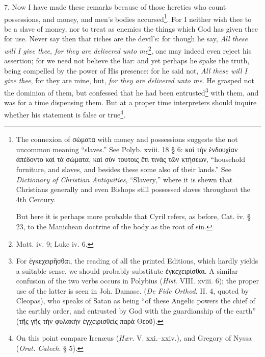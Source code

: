 7. Now I have made these remarks because of those heretics who count possessions, and money, and men’s bodies accursed\footnote{The connexion of \textgreek{σώματα} with money and possessions suggests the not uncommon meaning “slaves.” See Polyb. xviii. 18 § 6: \textgreek{καὶ τὴν ἐνδουχίαν ἀπέδοντο καὶ τὰ σώματα, καὶ σὺν τουτοις ἔτι τινὰς τῶν κτήσεων}, “household furniture, and slaves, and besides these some also of their lands.” See \emph{Dictionary of Christian Antiquities}, “Slavery,” where it is shewn that Christians generally and even Bishops still possessed slaves throughout the 4th Century. \par But here it is perhaps more probable that Cyril refers, as before, Cat. iv. § 23, to the Manichean doctrine of the body as the root of sin.}. For I neither wish thee to be a slave of money, nor to treat as enemies the things which God has given thee for use. Never say then that riches are the devil’s: for though he say, \emph{All these will I give thee, for they are delivered unto me}\footnote{Matt. iv. 9; Luke iv. 6.}, one may indeed even reject his assertion; for we need not believe the liar: and yet perhaps he spake the truth, being compelled by the power of His presence: for he said not, \emph{All these will I give thee}, for they are mine, but, \emph{for they are delivered unto me}. He grasped not the dominion of them, but confessed that he had been entrusted\footnote{For \textgreek{ἐγκεχειρῆσθαι}, the reading of all the printed Editions, which hardly yields a suitable sense, we should probably substitute \textgreek{ἐγκεχειρίσθαι}. A similar confusion of the two verbs occurs in Polybius (\emph{Hist}. VIII. xviii. 6); the proper use of the latter is seen in Joh. Damasc. (\emph{De Fide Orthod}. II. 4, quoted by Cleopas), who speaks of Satan as being “of these Angelic powers the chief of the earthly order, and entrusted by God with the guardianship of the earth” (\textgreek{τῆς γῆς τὴν φυλακὴν ἐγχειρισθεὶς παρὰ Θεοῦ}).} with them, and was for a time dispensing them. But at a proper time interpreters should inquire whether his statement is false or true\footnote{On this point compare Irenæus (\emph{Hær}. V. xxi.–xxiv.), and Gregory of Nyssa (\emph{Orat. Catech}. § 5).}.

